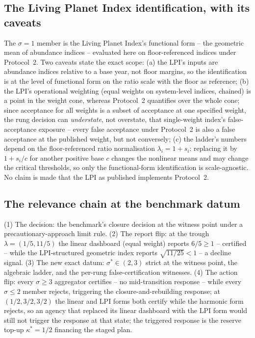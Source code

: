 \subsection{The Living Planet Index identification, with its caveats}

The $\sigma=1$ member is the Living Planet Index's functional form -- the geometric mean of abundance indices -- evaluated here on floor-referenced indices under Protocol~2. Two caveats state the exact scope: (a) the LPI's inputs are abundance indices relative to a base year, not floor margins, so the identification is at the level of functional form on the ratio scale with the floor as reference; (b) the LPI's operational weighting (equal weights on system-level indices, chained) is a point in the weight cone, whereas Protocol~2 quantifies over the whole cone; since acceptance for all weights is a subset of acceptance at one specified weight, the rung decision can \emph{understate}, not overstate, that single-weight index's false-acceptance exposure -- every false acceptance under Protocol~2 is also a false acceptance at the published weight, but not conversely; (c) the ladder's numbers depend on the floor-referenced ratio normalisation $\lambda_i=1+s_i$: replacing it by $1+s_i/c$ for another positive base $c$ changes the nonlinear means and may change the critical thresholds, so only the functional-form identification is scale-agnostic. No claim is made that the LPI as published implements Protocol~2.

\subsection{The relevance chain at the benchmark datum}

(1) The decision: the benchmark's closure decision at the witness point under a precautionary-approach limit rule. (2) The report flip: at the trough $\lambda=(1/5,11/5)$ the linear dashboard (equal weight) reports $6/5\ge1$ -- certified -- while the LPI-structured geometric index reports $\sqrt{11/25}<1$ -- a decline signal. (3) The new exact datum: $\sigma^*\in(2,3)$ strict at the witness point, the algebraic ladder, and the per-rung false-certification witnesses. (4) The action flip: every $\sigma\ge3$ aggregator certifies -- no mid-transition response -- while every $\sigma\le2$ member rejects, triggering the closure-and-rebuilding response; at $(1/2,3/2,3/2)$ the linear and LPI forms both certify while the harmonic form rejects, so an agency that replaced its linear dashboard with the LPI form would still not trigger the response at that state; the triggered response is the reserve top-up $\kappa^*=1/2$ financing the staged plan.

